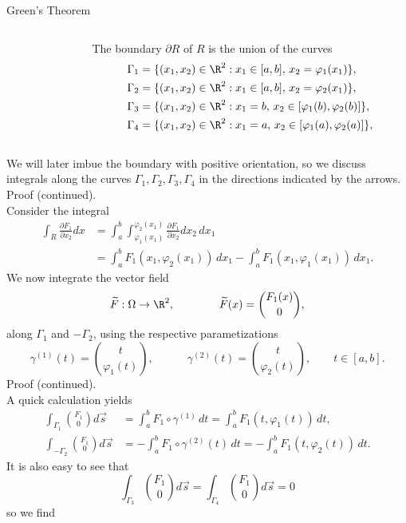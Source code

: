 \documentclass[smaller,hyperref={CJKbookmarks=true}]{beamer}
\begin{document}
\begin{frame}{Green's Theorem}
\begin{spacing}{1.05}
\begin{columns}[onlytextwidth]
\begin{column}{0.3\textwidth}
\end{column}
\begin{column}{0.7\textwidth}
The boundary $\partial R$ of $R$ is the union of the curves
    \begin{align*}
      \Gamma_1 &=\{(x_1,x_2)\in\R^2:x_1\in[a,b],\,x_2=\varphi_1(x_1)\}, \\
      \Gamma_2 &=\{(x_1,x_2)\in\R^2:x_1\in[a,b],\,x_2=\varphi_2(x_1)\}, \\
      \Gamma_3 &=\{(x_1,x_2)\in\R^2:x_1=b,\,x_2\in[\varphi_1(b),\varphi_2(b)]\}, \\
      \Gamma_4 &=\{(x_1,x_2)\in\R^2:x_1=a,\,x_2\in[\varphi_1(a),\varphi_2(a)]\},
    \end{align*}
\end{column}
\end{columns}
We will later imbue the boundary with positive orientation, so we discuss
integrals along the curves $\Gamma_1,\Gamma_2,\Gamma_3,\Gamma_4$ in the directions indicated by the arrows.
\newpage
\alert{Proof (continued).}\\
Consider the integral
\begin{equation}\label{3.4.2}
  \begin{split}
     \int_R\frac{\partial F_1}{\partial x_2}dx &=\int_{a}^{b}\int_{\varphi_1(x_1)}^{\varphi_2(x_1)}
     \frac{\partial F_1}{\partial x_2}dx_2\,dx_1 \\
       &=\int_{a}^{b}F_1(x_1,\varphi_2(x_1))\,dx_1-\int_{a}^{b}F_1(x_1,\varphi_1(x_1))\,dx_1.
  \end{split}
\end{equation}
We now integrate the vector field
\[\widetilde{F}:\Omega\to\R^2,\qquad\qquad
\widetilde{F}(x)=\binom{F_1(x)}{0},\]
along $\Gamma_1$ and $-\Gamma_2$, using the respective parametizations
\[\gamma^{(1)}(t)=\binom{t}{\varphi_1(t)},\qquad\quad
\gamma^{(2)}(t)=\binom{t}{\varphi_2(t)},\qquad
t\in[a,b].\]
\newpage
\alert{Proof (continued).}\\
A quick calculation yields
\begin{align*}
  \int_{\Gamma_1}\binom{F_1}{0}d\vec{s} &=\int_{a}^{b}F_1\circ\gamma^{(1)}\,dt=\int_{a}^{b}
  F_1(t,\varphi_1(t))\,dt, \\
  \int_{-\Gamma_2}\binom{F_1}{0}d\vec{s} &=-\int_{a}^{b}F_1\circ\gamma^{(2)}(t)\,dt=-\int_{a}^{b}
  F_1(t,\varphi_2(t))\,dt.
\end{align*}
It is also easy to see that
\[\int_{\Gamma_3}\binom{F_1}{0}d\vec{s}=
\int_{\Gamma_4}\binom{F_1}{0}d\vec{s}=0\]
so we find
\begin{equation}\label{3.4.3}

\end{equation}
\end{spacing}
\end{frame}
\end{document}

